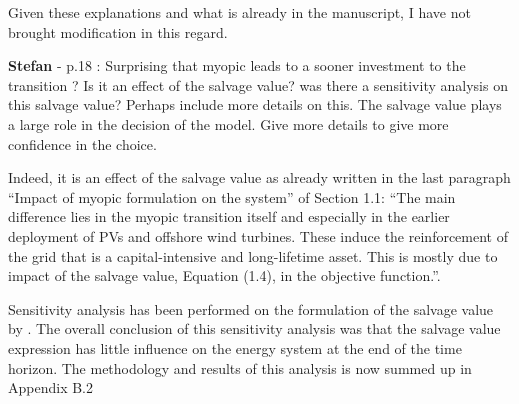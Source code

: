 \documentclass[12pt,a4paper]{article}
\begin{document}
Given these explanations and what is already in the manuscript, I have not brought modification in this regard.

\begin{mdframed}[style=comment] %
{\color{teal} \textbf{Stefan}} - p.18 : Surprising that myopic leads to a sooner investment to the transition ? Is it an effect of the salvage value? was there a sensitivity analysis on this salvage value? Perhaps include more details on this. The salvage value plays a large role in the decision of the model. Give more details to give more confidence in the choice.
\end{mdframed}

\noindent Indeed, it is an effect of the salvage value as already written in the last paragraph ``Impact of myopic formulation on the system'' of Section 1.1: ``The main difference lies in the myopic transition itself and especially in the earlier
deployment of PVs and offshore wind turbines. These induce the reinforcement of the grid that is a capital-intensive and long-lifetime asset. This is mostly due to impact of the salvage value, Equation (1.4), in the objective function.''.

Sensitivity analysis has been performed on the formulation of the salvage value by \citet{goffauxpathway}. The overall conclusion of this sensitivity analysis was that the salvage value expression has little influence on the energy system at the end of the time horizon. The methodology and results of this analysis is now summed up {\color{blue}in Appendix B.2} 
\end{document}

